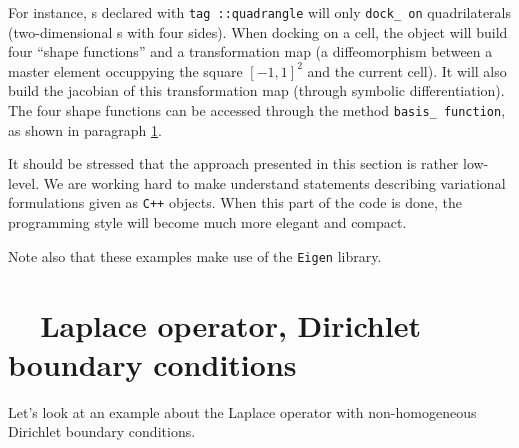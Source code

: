 For instance, {\small\tt{}}s declared with {\small\tt\textcolor{tag}{tag}%
::quadrangle} will only {\small\tt dock\_\,on} quadrilaterals
(two-dimensional {\small\tt{}}s with four sides).
When docking on a cell, the {\small\tt{}} object will build four
``shape functions'' and a transformation map (a diffeomorphism between a master element
occuppying the square $ [-1, 1]^2 $ and the current cell).
It will also build the jacobian of this transformation map (through symbolic differentiation).
The four shape functions can be accessed through the method {\small\tt basis\_\,function},
as shown in paragraph \ref{\numb section 6.\numb parag 2}.

It should be stressed that the approach presented in this section is rather low-level.
We are working hard to make {\maniFEM} understand statements describing variational
formulations given as {\tt C++} objects.
When this part of the code is done, the programming style will become much more elegant
and compact.

Note also that these examples make use of the {\small\tt Eigen} library.


\section{~~Laplace operator, Dirichlet boundary conditions}\label{\numb section 6.\numb parag 2}

Let's look at an example about the Laplace operator with non-homogeneous Dirichlet
boundary conditions.

